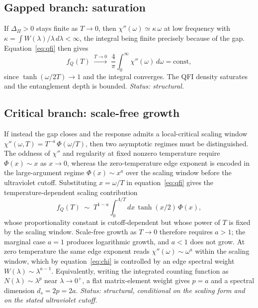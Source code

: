 \documentclass[11pt]{article}
\newcommand{\DPi}{\Delta_\Pi}
\newcommand{\fQ}{f_Q}
\begin{document}
\subsection{Gapped branch: saturation}

If $\DPi>0$ stays finite as $T\to 0$, then $\chi''(\omega)\simeq\kappa\,\omega$ at low frequency with
$\kappa=\int W(\lambda)/\lambda\,d\lambda<\infty$, the integral being finite precisely because of the gap.
Equation~\eqref{eq:qfi} then gives
\begin{equation}
\fQ(T)\;\xrightarrow{T\to 0}\;\frac{4}{\pi}\int_0^\infty \chi''(\omega)\,d\omega = \mathrm{const},
\end{equation}
since $\tanh(\omega/2T)\to 1$ and the integral converges.
The QFI density saturates and the entanglement depth is bounded.
\emph{Status: structural.}

\subsection{Critical branch: scale-free growth}

If instead the gap closes and the response admits a local-critical scaling window
$\chi''(\omega,T)=T^{-a}\,\Phi(\omega/T)$, then two asymptotic regimes must be distinguished.
The oddness of $\chi''$ and regularity at fixed nonzero temperature require $\Phi(x)\sim x$ as $x\to 0$, whereas the
zero-temperature edge exponent is encoded in the large-argument regime $\Phi(x)\sim x^{a}$ over the scaling window
before the ultraviolet cutoff.
Substituting $x=\omega/T$ in equation~\eqref{eq:qfi} gives the temperature-dependent scaling contribution
\begin{equation}
\fQ(T)\;\sim\;T^{1-a}\int_0^{\Lambda/T} dx\,\tanh(x/2)\,\Phi(x),
\label{eq:scaling}
\end{equation}
whose proportionality constant is cutoff-dependent but whose power of $T$ is fixed by the scaling window.
Scale-free growth as $T\to 0$ therefore requires $a>1$; the marginal case $a=1$ produces logarithmic growth, and
$a<1$ does not grow.
At zero temperature the same edge exponent reads $\chi''(\omega)\sim\omega^{a}$ within the scaling window, which by
equation~\eqref{eq:chi} is controlled by an edge spectral weight $W(\lambda)\sim\lambda^{a-1}$.
Equivalently, writing the integrated counting function as $N(\lambda)\sim\lambda^{p}$ near $\lambda\to 0^+$, a flat
matrix-element weight gives $p=a$ and a spectral dimension $d_s=2p=2a$.
\emph{Status: structural, conditional on the scaling form and on the stated ultraviolet cutoff.}
\end{document}
